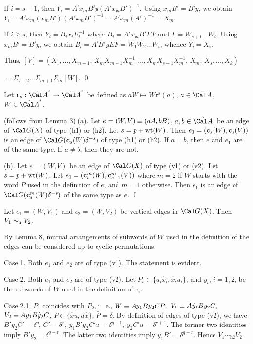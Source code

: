 If $i=s-1$, then $Y_i=A'x_m B' y (A'x_mB')^{-1}$. Using $x_m B'=B' y$, we obtain
$Y_i = A' x_m (x_m B')(A'x_mB')^{-1} = A' x_m (A')^{-1}=X_m$.

If $i\ge s$, then $Y_i = B_i x_i B_i^{-1}$ where
$B_i=A' x_m B' EF$ and
$F=W_{s+1}\dots W_i$. Using $x_m B'=B' y$,
we obtain $B_i = A'B'yEF = W_1W_2\dots W_i$, whence $Y_i=X_i$.

Thus, $[V] %
 = (X_1,\dots,X_{m-1},\,
    X_mX_{m+1}X_m^{-1},\dots, X_m X_{s-1} X_m^{-1},\, X_m,\,
     X_s,\dots,X_k)$
\par\noindent
$ = \Sigma_{s-2}\dots\Sigma_{m+1}\Sigma_m[W]$.
\qed
\enddemo

\break
Let $\bold c_s:\hA^*\to\hA^*$ be defined as
$aW\mapsto W\tau^s(a)$, $a\in\hA$, $W\in\hA^*$.


 {\rm(follows from Lemma 3)} (a).
Let $e=(W,V)\equiv(aA,bB)$, $a,b\in\hA$,
be an edge of $\Cal G(X)$ of type (h1) or (h2). Let $s=p+\operatorname{wt}(W)$.
Then $e_1=(\bold c_s(W),\bold c_s(V))$ is an edge of $\Cal
G(\bold c_s(\bar W)\delta^{-s})$
of type (h1) or (h2). If $a=b$, then $e$ and $e_1$ are of the same type.
If $a\ne b$, then they are not.

\smallskip\noindent
(b). Let $e=(W,V)$ be an edge of $\Cal G(X)$ of type (v1) or (v2). Let $s=p+\operatorname{wt}(W)$.
Let $e_1=(\bold c^m_s(W),\bold c^m_{s-1}(V))$ where $m=2$ 
if $W$ starts with the word $P$ used in the definition of $e$, and
$m=1$ otherwise.
Then $e_1$ is an edge of $\Cal G(\bold c_s^m(\bar W)\delta^{-s})$ 
of the same type as $e$. \qed
\endproclaim


Let $e_1=(W,V_1)$ and $e_2=(W,V_2)$ be vertical edges in $\Cal G(X)$.
Then $V_1\sim_{\text{h}} V_2$.
\endproclaim

By Lemma 8,  mutual arrangements of subwords of $W$
used in the definition of the edges can be considered up to cyclic
permutations.

Case 1. Both $e_1$ and $e_2$ are of type (v1). The statement is evident.


Case 2. Both $e_1$ and $e_2$ are of type (v2).
Let $P_i\in\{u_i\hat x_i,\hat x_iu_i\}$, and $y_i$, $i=1,2$, be the subwords of $W$
used in the definition of $e_i$.

Case 2.1. $P_1$ coincides with $P_2$, i.~e., $W\equiv Ay_1By_2CP$,
$V_1\equiv A\hat y_1By_2C$,
$V_2\equiv Ay_1B\hat y_2C$, $P\in\{\hat xu,u\hat x\}$, $\bar P=\delta$.
By definition of edges of type (v2), we have $B'y_2C'=\delta^q$, $C'=\delta^r$,
$y_1B'y_2C'u=\delta^{q+1}$, $y_2C'u=\delta^{r+1}$. The former two identities
imply $B'y_2=\delta^{q-r}$. The latter two identities imply $y_1B'=\delta^{q-r}$.
Hence $V_1\sim_{\text{h2}}V_2$.


